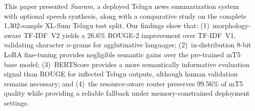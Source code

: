 \documentclass[runningheads]{llncs}
\begin{document}
This paper presented \textit{Saaram}, a deployed Telugu news
summarization system with optional speech synthesis, along
with a comparative study on the complete 1,302-sample
XL-Sum Telugu test split. Our findings show that:
(1)~morphology-aware TF-IDF~V2 yields a 26.6\% ROUGE-2
improvement over TF-IDF~V1, validating character
$n$-grams for agglutinative languages;
(2)~in-distribution 8-bit LoRA fine-tuning provides
negligible semantic gains over the pre-trained mT5 base
model;
(3)~BERTScore provides a more semantically informative
evaluation signal than ROUGE for inflected Telugu outputs,
although human validation remains necessary; and
(4)~the resource-aware router preserves 99.56\% of mT5
quality while providing a reliable fallback under
memory-constrained deployment settings.

\end{document}
